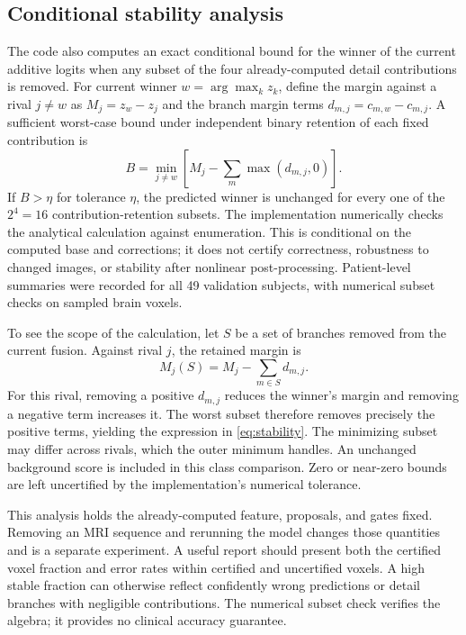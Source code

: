\documentclass[conference]{IEEEtran}
\begin{document}
\subsection{Conditional stability analysis}
The code also computes an exact conditional bound for the winner of the current additive logits when any subset of the four already-computed detail contributions is removed. For current winner $w=\arg\max_k z_k$, define the margin against a rival $j\ne w$ as $M_j=z_w-z_j$ and the branch margin terms $d_{m,j}=c_{m,w}-c_{m,j}$. A sufficient worst-case bound under independent binary retention of each fixed contribution is
\begin{equation}
B=\min_{j\ne w}\left[M_j-\sum_m\max(d_{m,j},0)\right].
\label{eq:stability}
\end{equation}
If $B>\eta$ for tolerance $\eta$, the predicted winner is unchanged for every one of the $2^4=16$ contribution-retention subsets. The implementation numerically checks the analytical calculation against enumeration. This is conditional on the computed base and corrections; it does not certify correctness, robustness to changed images, or stability after nonlinear post-processing. Patient-level summaries were recorded for all 49 validation subjects, with numerical subset checks on sampled brain voxels.

To see the scope of the calculation, let $S$ be a set of branches removed from the current fusion. Against rival $j$, the retained margin is
\begin{equation}
M_j(S)=M_j-\sum_{m\in S}d_{m,j}.
\label{eq:subsetmargin}
\end{equation}
For this rival, removing a positive $d_{m,j}$ reduces the winner's margin and removing a negative term increases it. The worst subset therefore removes precisely the positive terms, yielding the expression in \eqref{eq:stability}. The minimizing subset may differ across rivals, which the outer minimum handles. An unchanged background score is included in this class comparison. Zero or near-zero bounds are left uncertified by the implementation's numerical tolerance.

This analysis holds the already-computed feature, proposals, and gates fixed. Removing an MRI sequence and rerunning the model changes those quantities and is a separate experiment. A useful report should present both the certified voxel fraction and error rates within certified and uncertified voxels. A high stable fraction can otherwise reflect confidently wrong predictions or detail branches with negligible contributions. The numerical subset check verifies the algebra; it provides no clinical accuracy guarantee.
\end{document}

